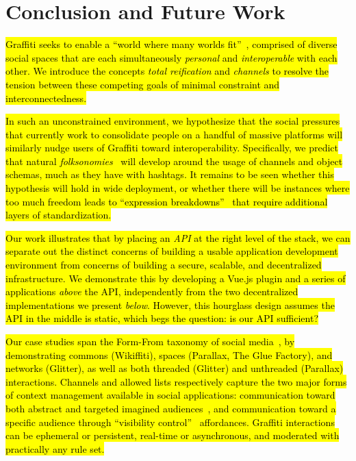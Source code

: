 \section{Conclusion and Future Work}

\hl{%
Graffiti seeks to enable a ``world where many worlds fit''~{\cite{escobarpluriverse}},
comprised of diverse social spaces that are each simultaneously \emph{personal}
and \emph{interoperable} with each other.
We introduce the concepts \emph{total reification} and \emph{channels}
to resolve the tension between these competing goals
of minimal constraint and interconnectedness.
}%

\hl{%
In such an unconstrained environment,
we hypothesize that the social pressures that currently work
to consolidate people on a handful of massive platforms
will similarly nudge users of Graffiti toward interoperability.
Specifically, we predict that natural \emph{folksonomies}~{\cite{folksonomy}} will
develop around the usage of channels and object schemas, much as they have with hashtags.
It remains to be seen whether this hypothesis will hold in wide deployment,
or whether there will be instances where too much freedom leads to
``expression breakdowns''~{\cite{expressionbreakdowns}}
that require additional layers of standardization.
}%

\hl{%
Our work illustrates that by placing an \emph{API}
at the right level of the stack, we can separate out the distinct concerns
of building a usable application development environment
from concerns of building a secure, scalable, and decentralized infrastructure.
We demonstrate this by developing a Vue.js plugin and a series
of applications \emph{above} the API, independently from the
two decentralized implementations we present \emph{below}.
However, this hourglass design assumes the API in the middle is static,
which begs the question: is our API sufficient?
}%

\hl{%
Our case studies span the Form-From taxonomy of social media~{\cite{formfrom}},
by demonstrating commons (Wikiffiti), spaces (Parallax, The Glue Factory), and networks (Glitter),
as well as both threaded (Glitter) and unthreaded (Parallax) interactions.
Channels and allowed lists respectively capture the two major
forms of context management available in social applications:
communication toward both abstract and targeted imagined audiences~{\cite{imaginedaudience}},
and communication toward a specific audience through ``visibility control''~{\cite{visibilitycontrol}} affordances.
Graffiti interactions can be ephemeral or persistent, real-time or asynchronous,
and moderated with practically any rule set.
}%

